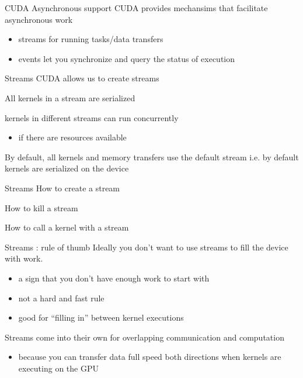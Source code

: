 \begin{frame}[fragile]{CUDA Asynchronous support}
    CUDA provides mechansims that facilitate asynchronous work

    \begin{itemize}
        \item streams for running tasks/data transfers
        \item events let you synchronize and query the status of execution
    \end{itemize}
\end{frame}

\begin{frame}[fragile]{Streams}
    CUDA allows us to create streams

    All kernels in a stream are serialized

    kernels in different streams can run concurrently
    \begin{itemize}
        \item if there are resources available
    \end{itemize}

    By default, all kernels and memory transfers use the default stream
    i.e. by default kernels are serialized on the device
\end{frame}

\begin{frame}[fragile]{Streams}
    How to create a stream

    How to kill a stream

    How to call a kernel with a stream
\end{frame}

\begin{frame}[fragile]{Streams : rule of thumb}
    Ideally you don't want to use streams to fill the device with work.
    \begin{itemize}
        \item a sign that you don't have enough work to start with
        \item not a hard and fast rule
        \item good for ``filling in'' between kernel executions
    \end{itemize}

    Streams come into their own for overlapping communication and computation
    \begin{itemize}
        \item because you can transfer data full speed both directions when kernels are executing on the GPU
    \end{itemize}
\end{frame}

